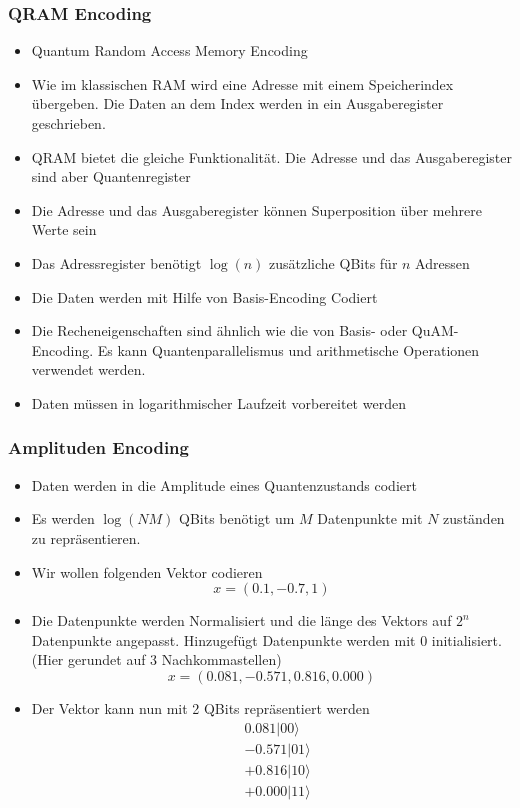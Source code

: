 \subsubsection{QRAM Encoding}

\begin{itemize}
    \item Quantum Random Access Memory Encoding
    \item Wie im klassischen RAM wird eine Adresse mit einem Speicherindex übergeben. Die Daten an dem Index werden in ein Ausgaberegister geschrieben.
    \item QRAM bietet die gleiche Funktionalität. Die Adresse und das Ausgaberegister sind aber Quantenregister
    \item Die Adresse und das Ausgaberegister können Superposition über mehrere Werte sein
    \item Das Adressregister benötigt $\log(n)$ zusätzliche QBits für $n$ Adressen
    \item Die Daten werden mit Hilfe von Basis-Encoding Codiert
    \item Die Recheneigenschaften sind ähnlich wie die von Basis- oder QuAM-Encoding. Es kann Quantenparallelismus und arithmetische Operationen verwendet werden.
    \item Daten müssen in logarithmischer Laufzeit vorbereitet werden
\end{itemize}

\subsubsection{Amplituden Encoding}
\begin{itemize}
    \item Daten werden in die Amplitude eines Quantenzustands codiert
    \item Es werden $\log(NM)$ QBits benötigt um $M$ Datenpunkte mit $N$ zuständen zu repräsentieren.
\end{itemize}
\begin{itemize}
    \item Wir wollen folgenden Vektor codieren 
    $$
        x = (0.1, -0.7, 1)
    $$
    \item Die Datenpunkte werden Normalisiert und die länge des Vektors auf $2^n$ Datenpunkte angepasst. Hinzugefügt Datenpunkte werden mit $0$ initialisiert. (Hier gerundet auf 3 Nachkommastellen)
    $$
        x = (0.081, -0.571, 0.816, 0.000)
    $$
    \item Der Vektor kann nun mit 2 QBits repräsentiert werden
    $$
          \begin{aligned}
            &0.081|00\rangle \\
            &-0.571|01\rangle \\
            &+0.816|10\rangle \\
            &+0.000|11\rangle
        \end{aligned}
    $$
\end{itemize}

